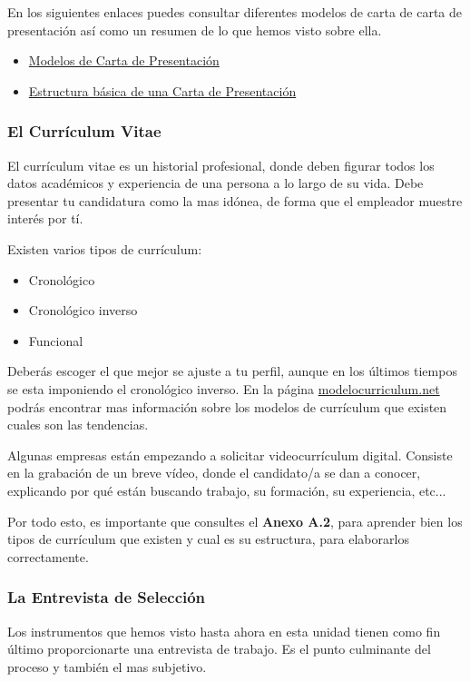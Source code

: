 En los siguientes enlaces puedes consultar diferentes modelos de carta de carta de presentación así como un resumen de lo que hemos visto sobre ella.

\begin{itemize}
    \item \href{https://www.modelocurriculum.net/modelos-carta-presentacion.html}{Modelos de Carta de Presentación}
    \item \href{https://www.mites.gob.es/es/mundo/consejerias/eeuu/webempleo/es/encontrar-empleo/cartapresentacion/index.htm}{Estructura básica de una Carta de Presentación}
\end{itemize}

\subsubsection*{El Currículum Vitae}
El currículum vitae es un historial profesional, donde deben figurar todos los datos académicos y experiencia de una persona a lo largo de su vida. Debe presentar tu candidatura como la mas idónea, de forma que el empleador muestre interés por tí.

Existen varios tipos de currículum:

\begin{itemize}
    \item Cronológico
    \item Cronológico inverso
    \item Funcional
\end{itemize}

Deberás escoger el que mejor se ajuste a tu perfil, aunque en los últimos tiempos se esta imponiendo el cronológico inverso. En la página \href{https://www.modelocurriculum.net/tipos-de-curriculum.html}{modelocurriculum.net} podrás encontrar mas información sobre los modelos de currículum que existen cuales son las tendencias.

Algunas empresas están empezando a solicitar videocurrículum digital. Consiste en la grabación de un breve vídeo, donde el candidato/a se dan a conocer, explicando por qué están buscando trabajo, su formación, su experiencia, etc...

Por todo esto, es importante que consultes el \textbf{Anexo A.2}, para aprender bien los tipos de currículum que existen y cual es su estructura, para elaborarlos correctamente.

\subsubsection{La Entrevista de Selección}
Los instrumentos que hemos visto hasta ahora en esta unidad tienen como fin último proporcionarte una entrevista de trabajo. Es el punto culminante del proceso y también el mas subjetivo.

